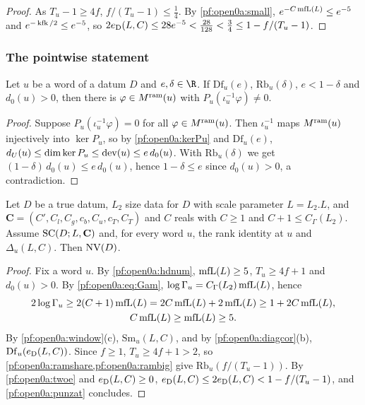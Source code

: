 \begin{proof}
As $T_u-1\ge4f$, $f/(T_u-1)\le\frac14$. By \cref{pf:open0a:small}, $e^{-C\operatorname{mfL}(L)}\le e^{-5}$ and
$e^{-\operatorname{kfk}/2}\le e^{-5}$, so $2e_{\mathrm{D}}(L,C)\le28e^{-5}<\frac{28}{128}<\frac34\le1-f/(T_u-1)$.
\end{proof}

\subsubsection{The pointwise statement}

\begin{lemma}\label{pf:open0a:punzat}
Let $u$ be a word of a datum $D$ and $e,\delta\in\R$. If $\mathrm{Df}_u(e)$, $\mathrm{Rb}_u(\delta)$, $e<1-\delta$
and $d_0(u)>0$, then there is $\varphi\in M^{\mathrm{ram}}(u)$ with $P_u(\iota_u^{-1}\varphi)\ne0$.
\end{lemma}

\begin{proof}
Suppose $P_u(\iota_u^{-1}\varphi)=0$ for all $\varphi\in M^{\mathrm{ram}}(u)$. Then $\iota_u^{-1}$ maps
$M^{\mathrm{ram}}(u)$ injectively into $\ker P_u$, so by \cref{pf:open0a:kerPu} and $\mathrm{Df}_u(e)$,
$d_U(u)\le\dim\ker P_u\le\operatorname{dev}(u)\le e\,d_0(u)$. With $\mathrm{Rb}_u(\delta)$ we get
$(1-\delta)\,d_0(u)\le e\,d_0(u)$, hence $1-\delta\le e$ since $d_0(u)>0$, a contradiction.
\end{proof}

\begin{proposition}\label{pf:open0a:punzsdiag}
Let $D$ be a true datum, $L_2$ size data for $D$ with scale parameter $L=L_2.L$, and $\mathbf C=(C',C_l,C_g,c_b,C_u,
c_T,C_T)$ and $C$ reals with $C\ge1$ and $C+1\le C_\Gamma(L_2)$. Assume $\mathrm{SC}(D;L,\mathbf C)$ and, for every
word $u$, the rank identity at $u$ and $\Delta_u(L,C)$. Then $\mathrm{NV}(D)$.
\end{proposition}

\begin{proof}
Fix a word $u$. By \cref{pf:open0a:hdnum}, $\operatorname{mfL}(L)\ge5$, $T_u\ge4f+1$ and $d_0(u)>0$. By
\eqref{pf:open0a:eq:Gam}, $\log\Gamma_u=C_\Gamma(L_2)\operatorname{mfL}(L)$, hence
\begin{gather*}
2\log\Gamma_u\ge2(C+1)\operatorname{mfL}(L)=2C\operatorname{mfL}(L)+2\operatorname{mfL}(L)\ge1+2C\operatorname{mfL}(L),\\
C\operatorname{mfL}(L)\ge\operatorname{mfL}(L)\ge5.
\end{gather*}
By \cref{pf:open0a:window}(c), $\mathrm{Sm}_u(L,C)$, and by \cref{pf:open0a:diagcor}(b),
$\mathrm{Df}_u(e_{\mathrm{D}}(L,C))$. Since $f\ge1$, $T_u\ge4f+1>2$, so \cref{pf:open0a:ramshare,pf:open0a:rambig} give
$\mathrm{Rb}_u(f/(T_u-1))$. By \cref{pf:open0a:twoe} and $e_{\mathrm{D}}(L,C)\ge0$,
$e_{\mathrm{D}}(L,C)\le2e_{\mathrm{D}}(L,C)<1-f/(T_u-1)$, and \cref{pf:open0a:punzat} concludes.
\end{proof}

